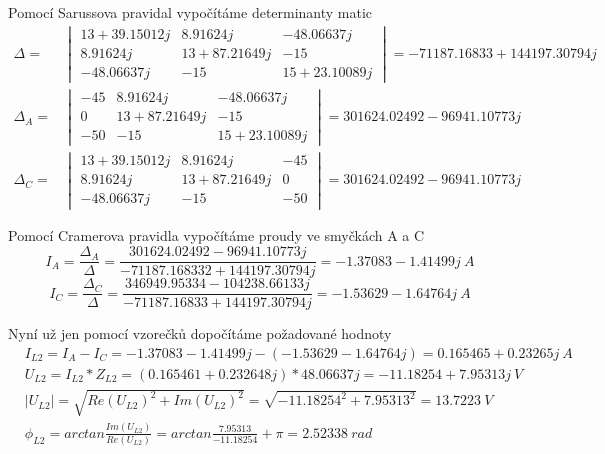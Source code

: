 Pomocí Sarussova pravidal vypočítáme determinanty matic
\begin{align*}
    \Delta = 
    &\begin{vmatrix}
        13 + 39.15012j & 8.91624j & -48.06637j \\
        8.91624j & 13 + 87.21649j & -15 \\
        -48.06637j & -15 & 15 + 23.10089j
    \end{vmatrix}
    = -71187.16833 + 144197.30794j \\
    \Delta_A = 
    &\begin{vmatrix}
        -45 & 8.91624j & -48.06637j \\
        0 & 13 + 87.21649j & -15 \\
        -50 & -15 & 15 + 23.10089j
    \end{vmatrix}
    =  301624.02492 - 96941.10773j \\
    \Delta_C = 
    &\begin{vmatrix}
        13 + 39.15012j & 8.91624j & -45 \\
        8.91624j & 13 + 87.21649j & 0 \\
        -48.06637j & -15 & -50
    \end{vmatrix}
    =  301624.02492 - 96941.10773j
\end{align*}

Pomocí Cramerova pravidla vypočítáme proudy ve smyčkách A a C
\[ I_A = \frac {\Delta_A} {\Delta} = \frac {301624.02492 - 96941.10773j} {-71187.168332 + 144197.30794j} = -1.37083 - 1.41499j \ A \]
\[ I_C = \frac {\Delta_C} {\Delta} = \frac {346949.95334 - 104238.66133j} {-71187.16833 + 144197.30794j} = -1.53629 - 1.64764j \ A \]

Nyní už jen pomocí vzorečků dopočítáme požadované hodnoty
\begin{align*}
    & I_{L2} = I_A - I_C = -1.37083 - 1.41499j - (-1.53629 - 1.64764j) = 0.165465 + 0.23265j \ A \\[6pt]
    & U_{L2} = I_{L2} * Z_{L2} = (0.165461 + 0.232648j) * 48.06637j = -11.18254 + 7.95313j \ V \\[6pt]
    & |U_{L2}| = \sqrt {Re(U_{L2})^2 + Im(U_{L2})^2} = \sqrt {-11.18254^2 + 7.95313^2} = 13.7223 \ V \\[6pt]
    & \phi_{L2} = arctan\frac {Im(U_{L2})} {Re(U_{L2})} = arctan\frac {7.95313} {-11.18254} + \pi = 2.52338\ rad
\end{align*}


